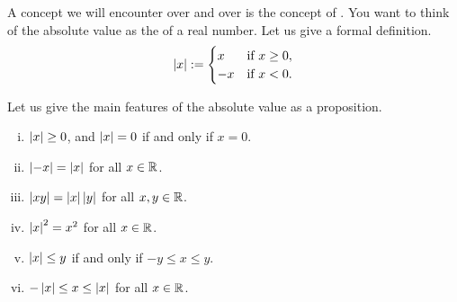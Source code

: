 
A concept we will encounter over and over is the concept of
\emph{}.
You want to think of the absolute value as the  of a real number.
Let us give a formal definition.
\begin{equation*}
\left\lvert {x} \right\rvert :=
\begin{cases}
x & \text{if } x \geq 0, \\
-x & \text{if } x < 0 .
\end{cases}
\end{equation*}

Let us give the main features of the absolute
value as a proposition.

\begin{prop} \label{prop:absbas}
\leavevmode
\begin{enumerate}[(i)]
\item \label{prop:absbas:i} $\left\lvert {x} \right\rvert \geq 0$, and $\left\lvert {x} \right\rvert=0$ if and only if $x = 0$.
\item \label{prop:absbas:ii} $\left\lvert {-x} \right\rvert = \left\lvert {x} \right\rvert$ for all $x \in {\mathbb{R}}$.
\item \label{prop:absbas:iii} $\left\lvert {xy} \right\rvert = \left\lvert {x} \right\rvert\left\lvert {y} \right\rvert$ for all $x,y \in {\mathbb{R}}$.
\item \label{prop:absbas:iv} $\left\lvert {x} \right\rvert^2 = x^2$ for all $x \in {\mathbb{R}}$.
\item \label{prop:absbas:v} $\left\lvert {x} \right\rvert \leq y$ if and only if $-y \leq x \leq y$.
\item \label{prop:absbas:vi} $-\left\lvert {x} \right\rvert \leq x \leq \left\lvert {x} \right\rvert$ for all $x \in {\mathbb{R}}$.
\end{enumerate}
\end{prop}

